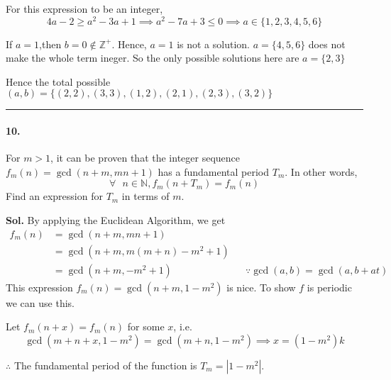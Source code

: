 \documentclass[12pt]{amsart}
\begin{document}
For this expression to be an integer,
$$
4a-2 \ge a^2-3a+1 \implies
a^2-7a+3 \le 0 \implies
a \in \{1,2,3,4,5,6\} 
$$

If $a = 1$,then $b=0 \notin \mathbb{Z}^+$. Hence, $a=1$ is not a solution.
$a = \{4,5,6\}$ does not make the whole term ineger.
So the only possible solutions here are $a=\{2, 3\}$

Hence the total possible $(a,b) = \{ (2,2), (3,3), (1,2), (2,1), (2, 3), (3,2)  \}$

\par\noindent\textcolor{gray}{\rule{\textwidth}{0.5pt}}

\paragraph*{10.} For $ m>1 $, it can be proven that the integer sequence $f_m(n) = \gcd{(n+m, mn+ 1)} $ has a fundamental period $ T_m $.  In other words,$$ \forall \text{ } n \in \mathbb{N} ,  f_m(n+T_m) =f_m(n) $$Find an expression for $T_m$ in terms of $ m $.

\bigskip
\textbf{Sol.}
By applying the Euclidean Algorithm, we get
\begin{align*}
    f_m(n) &= \gcd{(n+m, mn+ 1)} \\
           &= \gcd{(n+m, m(m+n)-m^2+1)} \\
           &= \gcd{(n+m, -m^2+1)} && \because \gcd{(a, b)} = \gcd{(a, b+at)}
\end{align*}
This expression $f_m(n) = \gcd{(n+m, 1-m^2)}$ is nice.
To show $f$ is periodic we can use this.

Let $f_m(n+x) = f_m(n)$ for some $x$, i.e.
$$
\gcd{(m+n+x, 1-m^2)} = \gcd{(m+n, 1-m^2)}
\implies x = (1-m^2)k 
$$

$\therefore$ The fundamental period of the function is $\boxed{T_m = |1-m^2|}$.

\end{document}
